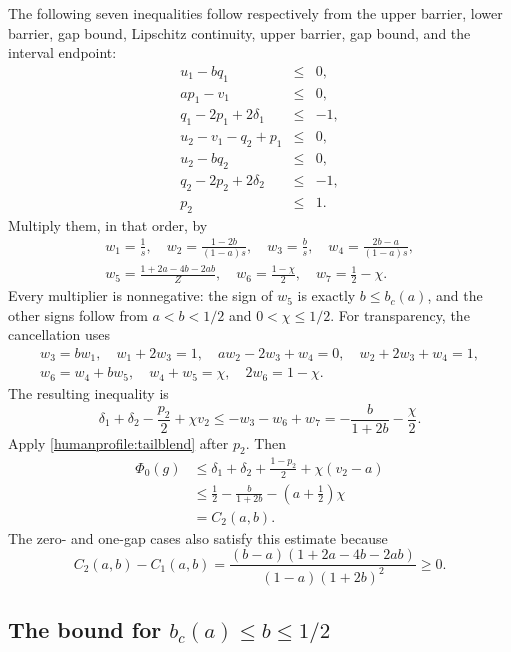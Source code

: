 The following seven inequalities follow respectively from the upper
barrier, lower barrier, gap bound, Lipschitz continuity, upper barrier,
gap bound, and the interval endpoint:
\[
 \begin{array}{rcl}
 u_1-bq_1&\le&0,\\
 ap_1-v_1&\le&0,\\
 q_1-2p_1+2\delta_1&\le&-1,\\
 u_2-v_1-q_2+p_1&\le&0,\\
 u_2-bq_2&\le&0,\\
 q_2-2p_2+2\delta_2&\le&-1,\\
 p_2&\le&1.
 \end{array}
\]
Multiply them, in that order, by
\[
 \begin{gathered}
 w_1=\frac1s,\quad
 w_2=\frac{1-2b}{(1-a)s},\quad
 w_3=\frac b s,\quad
 w_4=\frac{2b-a}{(1-a)s},\\
 w_5=\frac{1+2a-4b-2ab}{Z},\quad
 w_6=\frac{1-\chi}{2},\quad
 w_7=\frac12-\chi .
 \end{gathered}
\]
Every multiplier is nonnegative: the sign of \(w_5\) is exactly
\(b\le b_c(a)\), and the other signs follow from \(a<b<1/2\)
and \(0<\chi\le1/2\).
For transparency, the cancellation uses
\[
 \begin{gathered}
 w_3=bw_1,\quad w_1+2w_3=1,\quad
 aw_2-2w_3+w_4=0,\quad w_2+2w_3+w_4=1,\\
 w_6=w_4+bw_5,\quad w_4+w_5=\chi,\quad
 2w_6=1-\chi .
 \end{gathered}
\]
The resulting inequality is
\[
 \delta_1+\delta_2-\frac{p_2}{2}+\chi v_2
 \le-w_3-w_6+w_7=-\frac b{1+2b}-\frac\chi2.
\]
Apply \eqref{humanprofile:tailblend} after \(p_2\). Then
\[
 \begin{aligned}
 \Phi_0(g)
 &\le\delta_1+\delta_2+\frac{1-p_2}{2}+\chi(v_2-a)\\
 &\le\frac12-\frac b{1+2b}-\left(a+\frac12\right)\chi\\
 &=C_2(a,b).
 \end{aligned}
\]
The zero- and one-gap cases also satisfy this estimate because
\[
 C_2(a,b)-C_1(a,b)
 =\frac{(b-a)(1+2a-4b-2ab)}{(1-a)(1+2b)^2}\ge0.
\]

\subsection{The bound for \(b_c(a)\le b\le1/2\)}

